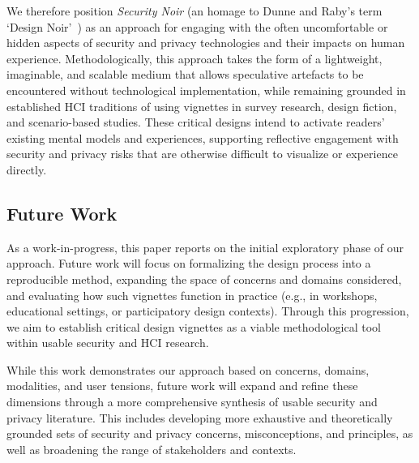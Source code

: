 We therefore position \textit{Security Noir} (an homage to Dunne and Raby’s term `Design Noir'~\cite{DuRa01}) as an approach for engaging with the often uncomfortable or hidden aspects of security and privacy technologies and their impacts on human experience. Methodologically, this approach takes the form of a lightweight, imaginable, and scalable medium that allows speculative artefacts to be encountered without technological implementation, while remaining grounded in established HCI traditions of using vignettes in survey research, design fiction, and scenario-based studies. These critical designs intend to activate readers’ existing mental models and experiences, supporting reflective engagement with security and privacy risks that are otherwise difficult to visualize or experience directly.



\subsection{Future Work}
\label{sec:future}

As a work-in-progress, this paper reports on the initial exploratory phase of our approach. Future work will focus on formalizing the design process into a reproducible method, expanding the space of concerns and domains considered, and evaluating how such vignettes function in practice (e.g., in workshops, educational settings, or participatory design contexts). Through this progression, we aim to establish critical design vignettes as a viable methodological tool within usable security and HCI research. 

While this work demonstrates our approach based on concerns, domains, modalities, and user tensions, future work will expand and refine these dimensions through a more comprehensive synthesis of usable security and privacy literature. This includes developing more exhaustive and theoretically grounded sets of security and privacy concerns, misconceptions, and principles, as well as broadening the range of stakeholders and contexts. 

